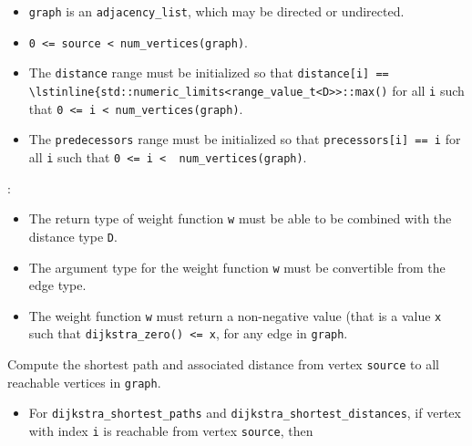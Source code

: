 \begin{itemdescr}
      \pnum\preconditions
            \begin{itemize}
                  \item
                        \lstinline{graph} is an \lstinline{adjacency_list}, which may be directed or
                        undirected.
                  \item
                        \lstinline{0 <= source < num_vertices(graph)}.
                  \item
                        The \lstinline{distance} range must be initialized so that
                        \lstinline{distance[i] == \lstinline{std::numeric_limits<range_value_t<D>>::max()}
                        for all \lstinline{i}
                        such that \lstinline{0 <= i < num_vertices(graph)}.  
                  \item
                        The \lstinline{predecessors} range must be initialized so that
                        \lstinline{precessors[i] == i} for all \lstinline{i} such that
                        \lstinline{0 <= i <  num_vertices(graph)}.
            \end{itemize}
      \pnum\requires:
            \begin{itemize}
                  \item
                        The return type of weight function \lstinline{w} must be able to
                        be combined with the distance type \lstinline{D}.
                  \item
                        The argument type for the weight
                        function \lstinline{w} must be convertible from the edge type.
                  \item
                        The weight function \lstinline{w} must return a non-negative value (that is
                        a value \lstinline{x} such that \lstinline{dijkstra_zero() <= x},
                        for any edge in \lstinline{graph}.
            \end{itemize}
      \pnum\effects
      Compute the shortest path and associated distance from vertex
      \lstinline{source} to all reachable vertices in \lstinline{graph}.
      \pnum\returns
            \begin{itemize}
                  \item
                        For \lstinline{dijkstra_shortest_paths} and \lstinline{dijkstra_shortest_distances},
                        if vertex with index \lstinline{i} is reachable from vertex \lstinline{source}, then

\end{itemize}
\end{itemdescr}
